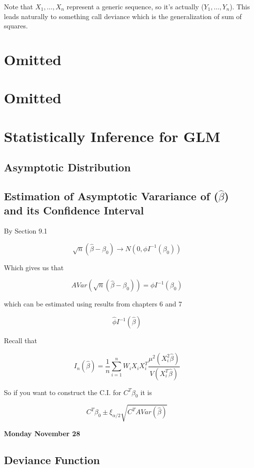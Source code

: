 \documentclass[11pt,fleqn]{book} %
\begin{document}
Note that $X_1, \dots, X_n$ represent a generic sequence, so it's actually ($Y_1, \dots, Y_n$). This leads naturally to something call deviance which is the generalization of sum of squares. 


\chapter{Omitted}
\chapter{Omitted}

\chapter{Statistically Inference for GLM}

\section{Asymptotic Distribution}

\section{Estimation of Asymptotic Varariance of ($\hat{\beta}$) and its Confidence Interval}

By Section 9.1 

		$$\sqrt{n}(\hat{\beta} - \beta_0) \rightarrow N(0, \phi I^{-1}(\beta_0))$$

Which gives us that

		$$AVar(\sqrt{n}(\hat{\beta} - \beta_0)) = \phi I^{-1}(\beta_0) $$

which can be estimated using results from chapters 6 and 7

		$$\hat{\phi} I^{-1}(\hat{\beta}) $$

Recall that

		$$I_n(\hat{\beta}) = \frac{1}{n} \sum^n_{i=1} W_i X_i X_i^T \frac{\mu^2(X_i^2 \hat{\beta})}{V(X_i^T \hat{\beta})} $$

So if you want to construct the C.I. for $C^T \beta_0$ it is

		$$ C^T \beta_0 \pm \xi_{\alpha/2} \sqrt{C^T AVar(\hat{\beta})}$$

		

\textbf{Monday November 28}\\

\section{Deviance Function}
\end{document}
